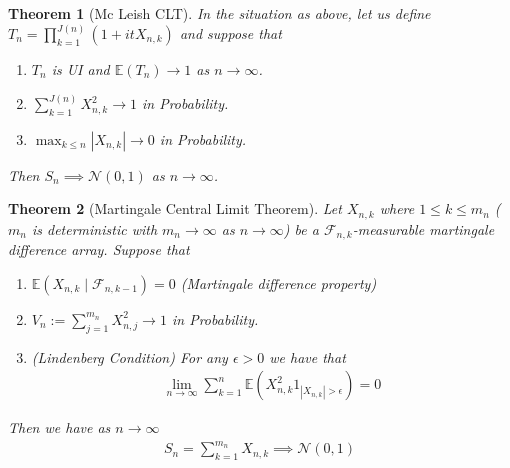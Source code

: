 \documentclass[11pt,a4paper, final]{article}
\newtheorem{thm}{Theorem}[section]
\theoremstyle{definition}
\begin{document}
\begin{thm}[Mc Leish CLT] In the situation as above, let us define \\ $T_n = \prod_{k=1}^{J(n)} (1 + it X_{n,k})$ and suppose that
\begin{enumerate}
\item $T_n$ is UI and $\mathbb{E}(T_n) \to 1$ as $n \to \infty$.
\item $ \sum_{k=1}^{J(n)} X_{n,k}^2 \to 1$ in Probability.
\item $\max_{k \leq n} |X_{n,k}| \to 0$ in Probability. 
\end{enumerate}
Then $S_n \implies \mathcal{N}(0,1)$ as $n \to \infty$. 
\end{thm}
\newpage
\begin{thm}[Martingale Central Limit Theorem] Let $X_{n,k}$ where $1 \leq k \leq m_n$ ($m_n$ is deterministic with $m_n \to \infty$ as $n \to \infty$) be a $\mathcal{F}_{n,k}$-measurable martingale difference array. Suppose that 
\begin{enumerate}
\item $\mathbb{E}(X_{n,k} \mid \mathcal{F}_{n,k-1}) = 0$ (Martingale difference property)
\item $V_n:= \sum_{j=1}^{m_n} X_{n,j}^2 \to 1$ in Probability.
\item (Lindenberg Condition) For any $\epsilon >0$ we have that 
\begin{align*}
\lim_{n \to \infty}  \sum_{k=1}^n \mathbb{E}(X_{n,k}^2 1_{ | X_{n,k}| > \epsilon}) = 0 
\end{align*}
\end{enumerate}
Then we have as $n \to \infty$ 
\begin{align*}
S_n=  \sum_{k=1}^{m_n} X_{n,k} \implies \mathcal{N}(0,1) 
\end{align*}
\end{thm}
\newpage
\end{document}
